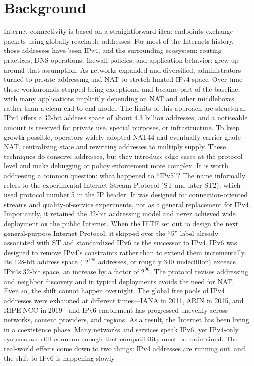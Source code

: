 \chapter{Background}
Internet connectivity is based on a straightforward idea: endpoints exchange packets using globally reachable addresses. For most of the Internets history, 
those addresses have been IPv4, and the surrounding ecosystem: routing practices, DNS operations, firewall policies, and application behavior: grew up around that assumption. As networks expanded and diversified, administrators turned to private addressing and NAT to stretch limited IPv4 space. Over time these workarounds stopped being exceptional and became part of the baseline, with many applications implicitly depending on NAT and other middleboxes rather than a clean end-to-end model.
The limits of this approach are structural. IPv4 offers a 32-bit address space of about 4.3 billion addresses, and a noticeable amount is reserved for private use, special purposes, or infrastructure. To keep growth possible, operators widely adopted NAT44 and eventually carrier-grade NAT, centralizing state and rewriting addresses to multiply supply. These techniques do conserve addresses, but they introduce edge cases at the protocol level and make debugging or policy enforcement more complex.
It is worth addressing a common question: what happened to “IPv5”? The name informally refers to the experimental Internet Stream Protocol (ST and later ST2), which used protocol number 5 in the IP header. It was designed for connection-oriented streams and quality-of-service experiments, not as a general replacement for IPv4. Importantly, it retained the 32-bit addressing model and never achieved wide deployment on the public Internet. When the IETF set out to design the next general-purpose Internet Protocol, it skipped over the “5” label already associated with ST and standardized IPv6 as the successor to IPv4.
IPv6 was designed to remove IPv4's constraints rather than to extend them incrementally. Its 128-bit address space $($ $2^{128}$ addresses, or  roughly 340 undecillion$)$ exceeds IPv4s 32-bit space, an increase by a factor of $2^{96}$. The protocol revises addressing and neighbor discovery and in typical deployments avoids the need for NAT. Even so, the shift cannot happen overnight. The global free pools of IPv4 addresses were exhausted at different times—IANA in 2011, ARIN in 2015, and RIPE NCC in 2019—and IPv6 enablement has progressed unevenly across networks, content providers, and regions. As a result, the Internet has been living in a coexistence phase. Many networks and services speak IPv6, yet IPv4-only systems are still common enough that compatibility must be maintained. The real-world effects come down to two things: IPv4 addresses are running out, and the shift to IPv6 is happening slowly.

